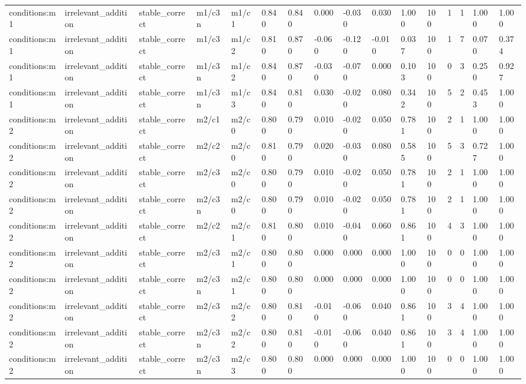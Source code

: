 \begin{tabular}{llllllllllllllll}
conditions:m1 & irrelevant\_addition & stable\_correct & m1/c3n & m1/c1 & 0.840 & 0.840 & 0.000 & -0.030 & 0.030 & 1.000 & 100 & 1 & 1 & 1.000 & 1.000 \\
conditions:m1 & irrelevant\_addition & stable\_correct & m1/c3 & m1/c2 & 0.810 & 0.870 & -0.060 & -0.120 & -0.010 & 0.037 & 100 & 1 & 7 & 0.070 & 0.374 \\
conditions:m1 & irrelevant\_addition & stable\_correct & m1/c3n & m1/c2 & 0.840 & 0.870 & -0.030 & -0.070 & 0.000 & 0.103 & 100 & 0 & 3 & 0.250 & 0.927 \\
conditions:m1 & irrelevant\_addition & stable\_correct & m1/c3n & m1/c3 & 0.840 & 0.810 & 0.030 & -0.020 & 0.080 & 0.342 & 100 & 5 & 2 & 0.453 & 1.000 \\
conditions:m2 & irrelevant\_addition & stable\_correct & m2/c1 & m2/c0 & 0.800 & 0.790 & 0.010 & -0.020 & 0.050 & 0.781 & 100 & 2 & 1 & 1.000 & 1.000 \\
conditions:m2 & irrelevant\_addition & stable\_correct & m2/c2 & m2/c0 & 0.810 & 0.790 & 0.020 & -0.030 & 0.080 & 0.585 & 100 & 5 & 3 & 0.727 & 1.000 \\
conditions:m2 & irrelevant\_addition & stable\_correct & m2/c3 & m2/c0 & 0.800 & 0.790 & 0.010 & -0.020 & 0.050 & 0.781 & 100 & 2 & 1 & 1.000 & 1.000 \\
conditions:m2 & irrelevant\_addition & stable\_correct & m2/c3n & m2/c0 & 0.800 & 0.790 & 0.010 & -0.020 & 0.050 & 0.781 & 100 & 2 & 1 & 1.000 & 1.000 \\
conditions:m2 & irrelevant\_addition & stable\_correct & m2/c2 & m2/c1 & 0.810 & 0.800 & 0.010 & -0.040 & 0.060 & 0.861 & 100 & 4 & 3 & 1.000 & 1.000 \\
conditions:m2 & irrelevant\_addition & stable\_correct & m2/c3 & m2/c1 & 0.800 & 0.800 & 0.000 & 0.000 & 0.000 & 1.000 & 100 & 0 & 0 & 1.000 & 1.000 \\
conditions:m2 & irrelevant\_addition & stable\_correct & m2/c3n & m2/c1 & 0.800 & 0.800 & 0.000 & 0.000 & 0.000 & 1.000 & 100 & 0 & 0 & 1.000 & 1.000 \\
conditions:m2 & irrelevant\_addition & stable\_correct & m2/c3 & m2/c2 & 0.800 & 0.810 & -0.010 & -0.060 & 0.040 & 0.861 & 100 & 3 & 4 & 1.000 & 1.000 \\
conditions:m2 & irrelevant\_addition & stable\_correct & m2/c3n & m2/c2 & 0.800 & 0.810 & -0.010 & -0.060 & 0.040 & 0.861 & 100 & 3 & 4 & 1.000 & 1.000 \\
conditions:m2 & irrelevant\_addition & stable\_correct & m2/c3n & m2/c3 & 0.800 & 0.800 & 0.000 & 0.000 & 0.000 & 1.000 & 100 & 0 & 0 & 1.000 & 1.000 \\

\end{tabular}
